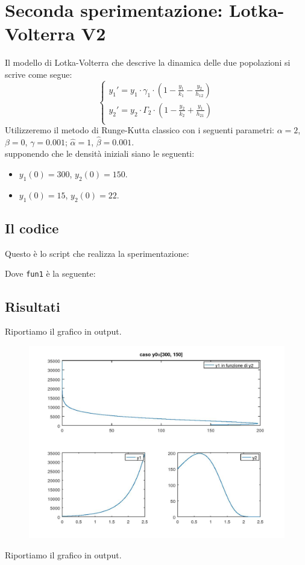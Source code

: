 \documentclass{article}
\begin{document}
	\section{Seconda sperimentazione: Lotka-Volterra V2}
	Il modello di Lotka-Volterra che descrive la dinamica delle due popolazioni si scrive come segue:
	\begin{equation}
	\begin{cases}
	y_1' = y_1 \cdot \gamma_1 \cdot (1-\frac{y_1}{k_1}-\frac{y_2}{h_12}) \\
	y_2' = y_2 \cdot \Gamma_2 \cdot (1-\frac{y_2}{k_2}+\frac{y_1}{h_21}) \\
	\end{cases}
	\end{equation}
	Utilizzeremo il metodo di Runge-Kutta classico con i seguenti parametri: $\alpha = 2$, $\beta = 0$, $\gamma = 0.001$; $\hat{\alpha} = 1$, $\hat{\beta} = 0.001$.\\
	supponendo che le densità iniziali siano le seguenti:
	\begin{itemize}
		\item $y_1(0) = 300$, $y_2(0) = 150$.
		\item $y_1(0) = 15$, $y_2(0) = 22$.
	\end{itemize}
	
	\subsection{Il codice}
	Questo è lo script che realizza la sperimentazione:
	
	Dove {\tt fun1} è la seguente:
	
	
	\subsection{Risultati}
	Riportiamo il grafico in output.\\
	\begin{figure}[htp!]
		\centering 
		\includegraphics[width=\textwidth]{4_2_a.jpeg}
	\end{figure}
	\newpage
	Riportiamo il grafico in output.\\
	
\end{document}
